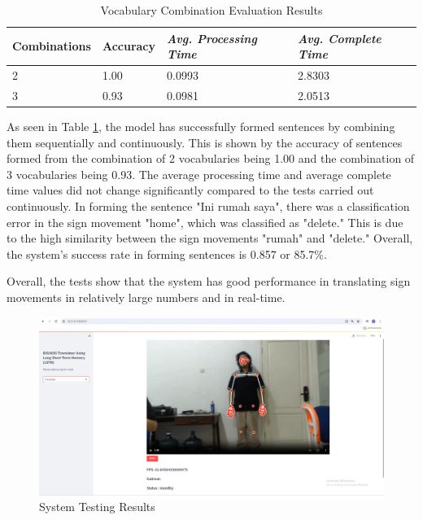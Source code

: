 \begin{table}[H]
  \caption{Vocabulary Combination Evaluation Results}
  \label{tb:combinationevaluation}
  \centering
  \begin{tabular}{llll}
    \hline
    \textbf{Combinations} & \textbf{Accuracy} & \emph{\textbf{Avg. Processing Time}} & \emph{\textbf{Avg. Complete Time}} \\
    \hline
    2  & 1.00 & 0.0993 & 2.8303 \\
    3  & 0.93 & 0.0981 & 2.0513 \\
    \hline
  \end{tabular}
\end{table}

As seen in Table \ref{tb:combinationevaluation}, the model has successfully formed sentences by combining them sequentially and continuously. This is shown by the accuracy of sentences formed from the combination of 2 vocabularies being 1.00 and the combination of 3 vocabularies being 0.93. The average processing time and average complete time values did not change significantly compared to the tests carried out continuously. In forming the sentence "Ini rumah saya", there was a classification error in the sign movement "home", which was classified as "delete." This is due to the high similarity between the sign movements "rumah" and "delete." Overall, the system's success rate in forming sentences is 0.857 or 85.7\%.

Overall, the tests show that the system has good performance in translating sign movements in relatively large numbers and in real-time.

\begin{figure}[ht]
    \centering
    \includegraphics[scale=0.12]{gambar/bab3-layoutweb.png}
    \caption{System Testing Results}
    \label{fig:layoutweb}
\end{figure}
